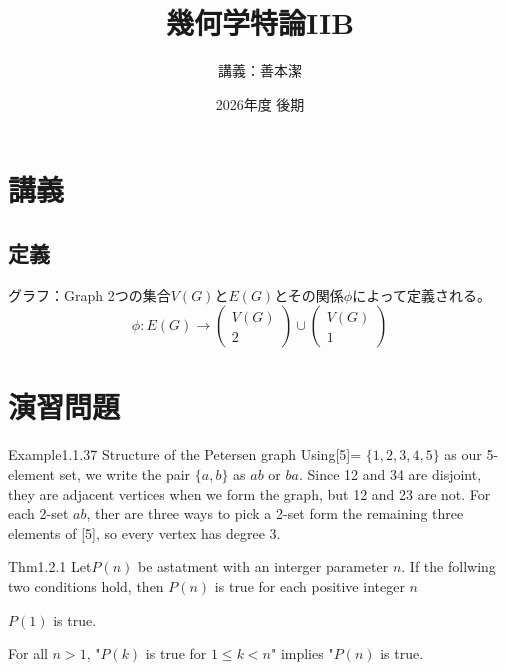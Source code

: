 \documentclass[dvipdfmx, leqno]{jsreport}
\title{幾何学特論IIB}
\author{講義：善本潔}
\date{2026年度 後期}
\begin{document}
\maketitle
\tableofcontents

\chapter{講義}
\section{定義}
\begin{soudef}{グラフ：Graph}
    2つの集合$V(G)$と$E(G)$とその関係$\phi$によって定義される。
\begin{equation*}
    \phi\colon E(G)\to \begin{pmatrix}V(G)\\ 2\end{pmatrix}\cup \begin{pmatrix}V(G)\\ 1\end{pmatrix}
\end{equation*}
\end{soudef}

\chapter{演習問題}
\begin{soupractice}{Example1.1.37}
    Structure of the Petersen graph Using[5]= $\{1, 2, 3, 4, 5\}$ as our 5-element set, we write the pair $\{a, b\}$ as $ab$ or $ba$. Since 12 and 34 are disjoint, they are adjacent vertices when we form the graph, but 12 and 23 are not. For each 2-set $ab$, ther are three ways to pick a 2-set form the remaining three elements of [5], so every vertex has degree 3.\\

\end{soupractice}

\begin{soupractice}{Thm1.2.1}
    Let$P(n)$ be astatment with an interger parameter $n$. If the follwing two conditions hold, then $P(n)$ is true for each positive integer $n$
\begin{enumerate_roman}
    \item $P(1)$ is true.
    \item For all $n> 1$, "$P(k)$ is true for $1\le k< n$" implies "$P(n)$ is true.
\end{enumerate_roman}
\end{soupractice}
\end{document}
